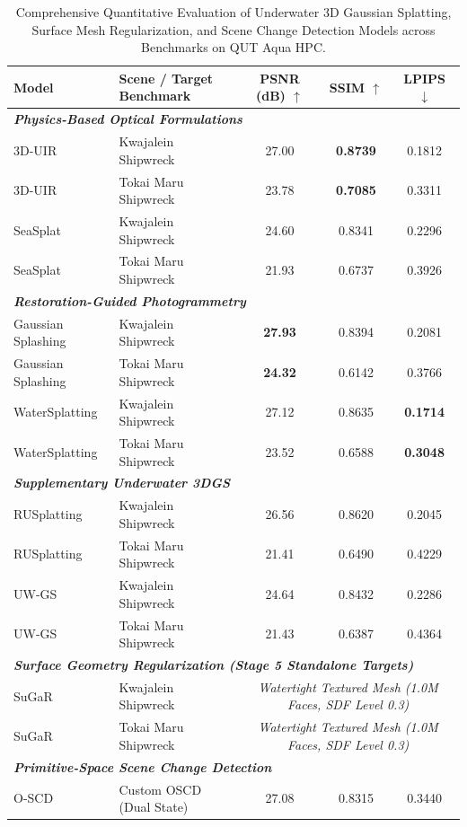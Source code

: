 \begin{table}[htbp]
\centering
\small
\setlength{\tabcolsep}{6pt}
\renewcommand{\arraystretch}{1.15}
\caption{Comprehensive Quantitative Evaluation of Underwater 3D Gaussian Splatting, Surface Mesh Regularization, and Scene Change Detection Models across Benchmarks on QUT Aqua HPC.}
\label{tab:master_ump_benchmarks}
\begin{tabularx}{\textwidth}{l X c c c}
\toprule
\textbf{Model} & \textbf{Scene / Target Benchmark} & \textbf{PSNR (dB)} $\uparrow$ & \textbf{SSIM} $\uparrow$ & \textbf{LPIPS} $\downarrow$ \\
\midrule
\multicolumn{5}{l}{\textit{\textbf{Physics-Based Optical Formulations}}} \\
\midrule
3D-UIR & Kwajalein Shipwreck & 27.00 & \textbf{0.8739} & 0.1812 \\
3D-UIR & Tokai Maru Shipwreck & 23.78 & \textbf{0.7085} & 0.3311 \\
SeaSplat & Kwajalein Shipwreck & 24.60 & 0.8341 & 0.2296 \\
SeaSplat & Tokai Maru Shipwreck & 21.93 & 0.6737 & 0.3926 \\
\midrule
\multicolumn{5}{l}{\textit{\textbf{Restoration-Guided Photogrammetry}}} \\
\midrule
Gaussian Splashing & Kwajalein Shipwreck & \textbf{27.93} & 0.8394 & 0.2081 \\
Gaussian Splashing & Tokai Maru Shipwreck & \textbf{24.32} & 0.6142 & 0.3766 \\
WaterSplatting & Kwajalein Shipwreck & 27.12 & 0.8635 & \textbf{0.1714} \\
WaterSplatting & Tokai Maru Shipwreck & 23.52 & 0.6588 & \textbf{0.3048} \\
\midrule
\multicolumn{5}{l}{\textit{\textbf{Supplementary Underwater 3DGS}}} \\
\midrule
RUSplatting & Kwajalein Shipwreck & 26.56 & 0.8620 & 0.2045 \\
RUSplatting & Tokai Maru Shipwreck & 21.41 & 0.6490 & 0.4229 \\
UW-GS & Kwajalein Shipwreck & 24.64 & 0.8432 & 0.2286 \\
UW-GS & Tokai Maru Shipwreck & 21.43 & 0.6387 & 0.4364 \\
\midrule
\multicolumn{5}{l}{\textit{\textbf{Surface Geometry Regularization (Stage 5 Standalone Targets)}}} \\
\midrule
SuGaR & Kwajalein Shipwreck & \multicolumn{3}{c}{\textit{Watertight Textured Mesh (1.0M Faces, SDF Level 0.3)}} \\
SuGaR & Tokai Maru Shipwreck & \multicolumn{3}{c}{\textit{Watertight Textured Mesh (1.0M Faces, SDF Level 0.3)}} \\
\midrule
\multicolumn{5}{l}{\textit{\textbf{Primitive-Space Scene Change Detection}}} \\
\midrule
O-SCD & Custom OSCD (Dual State) & 27.08 & 0.8315 & 0.3440 \\
\bottomrule
\end{tabularx}
\end{table}

